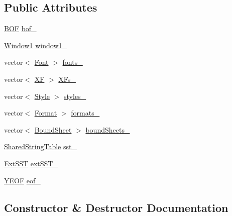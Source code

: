 \subsection*{Public Attributes}
\begin{DoxyCompactItemize}
\item 
\hyperlink{struct_y_excel_1_1_b_o_f}{B\+O\+F} \hyperlink{class_y_excel_1_1_workbook_aea7309eccb00e2d8a0b675d0c3c7cdd4}{bof\+\_\+}
\item 
\hyperlink{struct_y_excel_1_1_workbook_1_1_window1}{Window1} \hyperlink{class_y_excel_1_1_workbook_a55de50376ca094a43a4f7ae4d0a8eef5}{window1\+\_\+}
\item 
vector$<$ \hyperlink{struct_y_excel_1_1_workbook_1_1_font}{Font} $>$ \hyperlink{class_y_excel_1_1_workbook_a52d5b091f5d1518c23ff0a3dae75f337}{fonts\+\_\+}
\item 
vector$<$ \hyperlink{struct_y_excel_1_1_workbook_1_1_x_f}{X\+F} $>$ \hyperlink{class_y_excel_1_1_workbook_a1112ee5c936e7b8ec1bf79e5bf216ff1}{X\+Fs\+\_\+}
\item 
vector$<$ \hyperlink{struct_y_excel_1_1_workbook_1_1_style}{Style} $>$ \hyperlink{class_y_excel_1_1_workbook_af1aa9822f42bb0b71a32e21a1f321ef9}{styles\+\_\+}
\item 
vector$<$ \hyperlink{struct_y_excel_1_1_workbook_1_1_format}{Format} $>$ \hyperlink{class_y_excel_1_1_workbook_ad633901d0a8877218a752501cca49e34}{formats\+\_\+}
\item 
vector$<$ \hyperlink{struct_y_excel_1_1_workbook_1_1_bound_sheet}{Bound\+Sheet} $>$ \hyperlink{class_y_excel_1_1_workbook_ab19f8d40e6b59a48c585ea5e47b690e0}{bound\+Sheets\+\_\+}
\item 
\hyperlink{struct_y_excel_1_1_workbook_1_1_shared_string_table}{Shared\+String\+Table} \hyperlink{class_y_excel_1_1_workbook_a5fd3f2b036672d6ef9d8208cc790a3c3}{sst\+\_\+}
\item 
\hyperlink{struct_y_excel_1_1_workbook_1_1_ext_s_s_t}{Ext\+S\+S\+T} \hyperlink{class_y_excel_1_1_workbook_af31815fddd82ad2a701ac512554ccb40}{ext\+S\+S\+T\+\_\+}
\item 
\hyperlink{struct_y_excel_1_1_y_e_o_f}{Y\+E\+O\+F} \hyperlink{class_y_excel_1_1_workbook_a621f6b35ae8b9fb9f2dbf7e6aaf65ddf}{eof\+\_\+}
\end{DoxyCompactItemize}


\subsection{Constructor \& Destructor Documentation}
\hypertarget{class_y_excel_1_1_workbook_aea85d73eb37cc62ddaab0ffec439f952}{}
